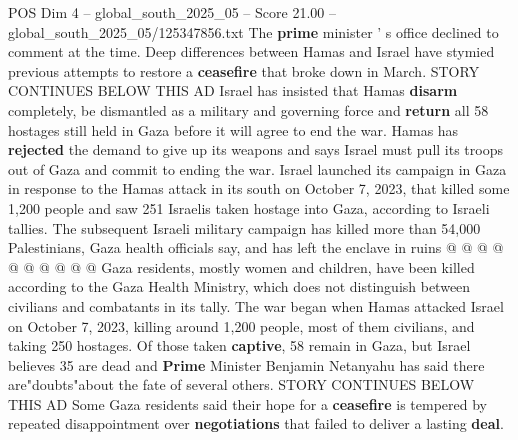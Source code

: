 \begin{textsample}{POS Dim 4 – global\_south\_2025\_05 – Score 21.00 – global\_south\_2025\_05/125347856.txt}
The \textbf{prime} minister ' s office declined to comment at the time.
Deep differences between Hamas and Israel have stymied previous attempts to restore a \textbf{ceasefire} that broke down in March.
STORY CONTINUES BELOW THIS AD Israel has insisted that Hamas \textbf{disarm} completely, be dismantled as a military and governing force and \textbf{return} all 58 hostages still held in Gaza before it will agree to end the war.
Hamas has \textbf{rejected} the demand to give up its weapons and says Israel must pull its troops out of Gaza and commit to ending the war.
Israel launched its campaign in Gaza in response to the Hamas attack in its south on October 7, 2023, that killed some 1,200 people and saw 251 Israelis taken hostage into Gaza, according to Israeli tallies.
The subsequent Israeli military campaign has killed more than 54,000 Palestinians, Gaza health officials say, and has left the enclave in ruins @ @ @ @ @ @ @ @ @ @ Gaza residents, mostly women and children, have been killed according to the Gaza Health Ministry, which does not distinguish between civilians and combatants in its tally.
The war began when Hamas attacked Israel on October 7, 2023, killing around 1,200 people, most of them civilians, and taking 250 hostages.
Of those taken \textbf{captive}, 58 remain in Gaza, but Israel believes 35 are dead and \textbf{Prime} Minister Benjamin Netanyahu has said there are"doubts"about the fate of several others.
STORY CONTINUES BELOW THIS AD Some Gaza residents said their hope for a \textbf{ceasefire} is tempered by repeated disappointment over \textbf{negotiations} that failed to deliver a lasting \textbf{deal}.

\end{textsample}

